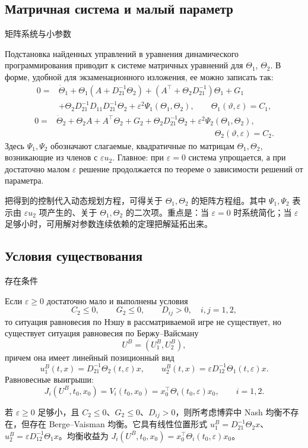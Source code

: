 \documentclass[12pt,a4paper]{article}
\newcommand{\zh}[1]{\par\noindent #1\par}
\begin{document}
\subsection*{Матричная система и малый параметр}
\zh{矩阵系统与小参数}
Подстановка найденных управлений в уравнения динамического программирования приводит к системе матричных уравнений для \(\Theta_1\), \(\Theta_2\). В форме, удобной для экзаменационного изложения, ее можно записать так:
\[
\begin{aligned}
0={}&\dot\Theta_1+
\Theta_1(A+D_{21}^{-1}\Theta_2)+(A^{\top}+\Theta_2D_{21}^{-1})\Theta_1+G_1 \\
&+\Theta_2D_{21}^{-1}D_{11}D_{21}^{-1}\Theta_2
+\varepsilon^2\Psi_1(\Theta_1,\Theta_2),
\qquad \Theta_1(\vartheta,\varepsilon)=C_1,
\end{aligned}
\]
\[
\begin{aligned}
0={}&\dot\Theta_2+
\Theta_2A+A^{\top}\Theta_2+G_2+\Theta_2D_{21}^{-1}\Theta_2
+\varepsilon^2\Psi_2(\Theta_1,\Theta_2),\\
&\hspace{8cm}\Theta_2(\vartheta,\varepsilon)=C_2.
\end{aligned}
\]
Здесь \(\Psi_1,\Psi_2\) обозначают слагаемые, квадратичные по матрицам \(\Theta_1,\Theta_2\), возникающие из членов с \(\varepsilon u_2\). Главное: при \(\varepsilon=0\) система упрощается, а при достаточно малом \(\varepsilon\) решение продолжается по теореме о зависимости решений от параметра.
\zh{把得到的控制代入动态规划方程，可得关于 \(\Theta_1,\Theta_2\) 的矩阵方程组。其中 \(\Psi_1,\Psi_2\) 表示由 \(\varepsilon u_2\) 项产生的、关于 \(\Theta_1,\Theta_2\) 的二次项。重点是：当 \(\varepsilon=0\) 时系统简化；当 \(\varepsilon\) 足够小时，可用解对参数连续依赖的定理把解延拓出来。}

\subsection*{Условия существования}
\zh{存在条件}
Если \(\varepsilon\ge 0\) достаточно мало и выполнены условия
\[
C_2\le 0,
\qquad G_2\le 0,
\qquad D_{ij}>0,
\quad i,j=1,2,
\]
то ситуация равновесия по Нэшу в рассматриваемой игре не существует, но существует ситуация равновесия по Бержу--Вайсману
\[
U^B=(U_1^B,U_2^B),
\]
причем она имеет линейный позиционный вид
\[
u_1^B(t,x)=D_{21}^{-1}\Theta_2(t,\varepsilon)x,
\qquad
u_2^B(t,x)=\varepsilon D_{12}^{-1}\Theta_1(t,\varepsilon)x.
\]
Равновесные выигрыши:
\[
J_i(U^B,t_0,x_0)=V_i(t_0,x_0)=x_0^{\top}\Theta_i(t_0,\varepsilon)x_0,
\qquad i=1,2.
\]
\zh{若 \(\varepsilon\ge0\) 足够小，且 \(C_2\le0\)、\(G_2\le0\)、\(D_{ij}>0\)，则所考虑博弈中 Nash 均衡不存在，但存在 Berge--Vaisman 均衡。它具有线性位置形式 \(u_1^B=D_{21}^{-1}\Theta_2x\)、\(u_2^B=\varepsilon D_{12}^{-1}\Theta_1x\)。均衡收益为 \(J_i(U^B,t_0,x_0)=x_0^\top\Theta_i(t_0,\varepsilon)x_0\)。}
\end{document}
